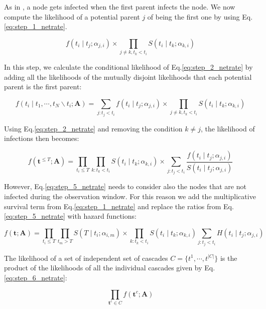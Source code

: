 \documentclass[11pt]{article}
\begin{document}
As in \cite{kempe2003maximizing}, a node gets infected when the first parent infects the node. We now compute the likelihood of a potential parent $j$ of being the first one by using Eq.\ref{eq:step_1_netrate}.

\begin{equation}\label{eq:step_3_netrate}
f(t_{i}\mid t_{j};\alpha_{j,i})\times \prod_{j\neq k,t_{k}< t_{i}}S(t_{i}\mid t_{k};\alpha _{k,i})
\end{equation}
 
In this step, we calculate the conditional likelihood of Eq.\ref{eq:step_2_netrate} by adding all the likelihoods of the mutually disjoint likelihoods that each potential parent is the first parent:

\begin{equation}\label{eq:step_4_netrate}
f(t_{i}\mid t_{1},\cdots,t_{N}\backslash t_{i};\textbf{A})=\sum_{j:t_{j}<t_{i}}f(t_{i}\mid t_{j};\alpha _{j,i})\times \prod _{j\neq k,t_{k}<t_{i}}S(t_{i}\mid t_{k};\alpha _{k,i})
\end{equation}

Using Eq.\ref{eq:step_2_netrate} and removing the condition $k\neq j$, the likelihood of infections then becomes:

\begin{equation}\label{eq:step_5_netrate}
f(\textbf{t}^{\leq T};\textbf{A})=\prod_{t_{i}\leq T}\prod_{k:t_{k}<t_{i}}S(t_{i}\mid t_{k};\alpha _{k,i})\times \sum_{j:t_{j}<t_{i}}\frac{f(t_{i}\mid t_{j};\alpha_{j,i})}{S(t_{i}\mid t_{j};\alpha _{j,i})}
\end{equation}

However, Eq.\ref{eq:step_5_netrate} needs to consider also the nodes that are not infected during the observation window. For this reason we add the multiplicative survival term from Eq.\ref{eq:step_1_netrate} and replace the ratios from Eq.\ref{eq:step_5_netrate} with hazard functions:

\begin{equation}\label{eq:step_6_netrate}
f(\textbf{t};\textbf{A})=\prod_{t_{i}\leq T}\prod_{t_{m}>T}S(T\mid t_{i};\alpha_{i,m})\times \prod_{k:t_{k}<t_{i}}S(t_{i}\mid t_{k};\alpha _{k,i})\sum_{j:t_{j}<t_{i}}H(t_{i}\mid t_{j};\alpha _{j,i})
\end{equation}

The likelihood of a set of independent set of cascades $C=\{t^{1},\cdots,t^{|C|}\}$ is the product of the likelihoods of all the individual cascades given by Eq.\ref{eq:step_6_netrate}:

\begin{equation}\label{eq:step_7_netrate}
\prod _{\textbf{t}^{c}\in C}f(\textbf{t}^{c};\textbf{A})
\end{equation}
\end{document}
